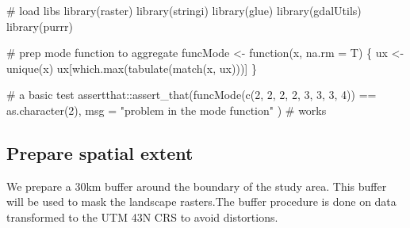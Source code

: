 \documentclass[]{article}
\newenvironment{Shaded}{}{}
\newcommand{\CommentTok}[1]{\textcolor[rgb]{0.00,0.50,0.00}{#1}}
\newcommand{\ControlFlowTok}[1]{\textcolor[rgb]{0.00,0.00,1.00}{#1}}
\newcommand{\DataTypeTok}[1]{#1}
\newcommand{\DecValTok}[1]{#1}
\newcommand{\FloatTok}[1]{#1}
\newcommand{\KeywordTok}[1]{\textcolor[rgb]{0.00,0.00,1.00}{#1}}
\newcommand{\NormalTok}[1]{#1}
\newcommand{\OperatorTok}[1]{#1}
\newcommand{\StringTok}[1]{\textcolor[rgb]{0.00,0.50,0.50}{#1}}
\begin{document}
\begin{Shaded}
\begin{Highlighting}[numbers=left,,]

\CommentTok{# load libs}
\KeywordTok{library}\NormalTok{(raster)}
\KeywordTok{library}\NormalTok{(stringi)}
\KeywordTok{library}\NormalTok{(glue)}
\KeywordTok{library}\NormalTok{(gdalUtils)}
\KeywordTok{library}\NormalTok{(purrr)}

\CommentTok{# prep mode function to aggregate}
\NormalTok{funcMode <-}\StringTok{ }\ControlFlowTok{function}\NormalTok{(x, }\DataTypeTok{na.rm =}\NormalTok{ T) \{}
\NormalTok{  ux <-}\StringTok{ }\KeywordTok{unique}\NormalTok{(x)}
\NormalTok{  ux[}\KeywordTok{which.max}\NormalTok{(}\KeywordTok{tabulate}\NormalTok{(}\KeywordTok{match}\NormalTok{(x, ux)))]}
\NormalTok{\}}

\CommentTok{# a basic test}
\NormalTok{assertthat}\OperatorTok{::}\KeywordTok{assert_that}\NormalTok{(}\KeywordTok{funcMode}\NormalTok{(}\KeywordTok{c}\NormalTok{(}\DecValTok{2}\NormalTok{, }\DecValTok{2}\NormalTok{, }\DecValTok{2}\NormalTok{, }\DecValTok{2}\NormalTok{, }\DecValTok{3}\NormalTok{, }\DecValTok{3}\NormalTok{, }\DecValTok{3}\NormalTok{, }\DecValTok{4}\NormalTok{)) }\OperatorTok{==}\StringTok{ }\KeywordTok{as.character}\NormalTok{(}\DecValTok{2}\NormalTok{),}
  \DataTypeTok{msg =} \StringTok{"problem in the mode function"}
\NormalTok{) }\CommentTok{# works}
\end{Highlighting}
\end{Shaded}

\hypertarget{prepare-spatial-extent}{%
\subsection{Prepare spatial extent}\label{prepare-spatial-extent}}

We prepare a 30km buffer around the boundary of the study area. This buffer will be used to mask the landscape rasters.The buffer procedure is done on data transformed to the UTM 43N CRS to avoid distortions.

\begin{Shaded}
\end{Shaded}
\end{document}
